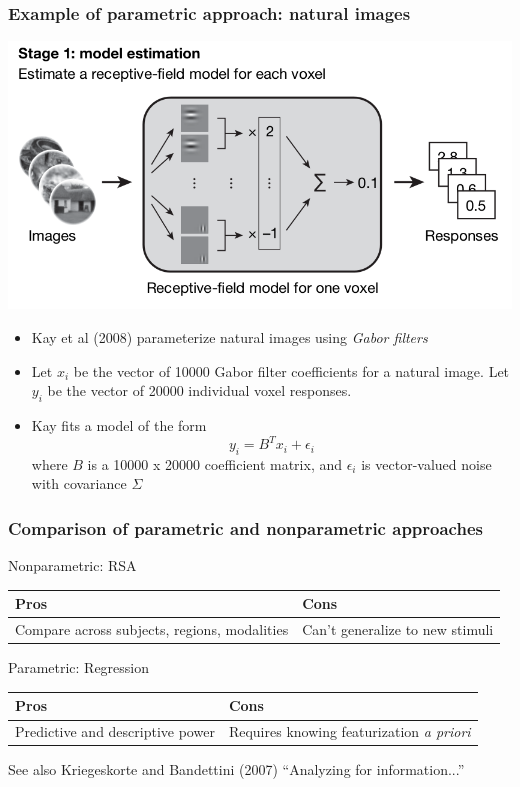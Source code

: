 \documentclass{beamer}
\begin{document}
\begin{frame}
\frametitle{Example of parametric approach: natural images}
\begin{center}
\includegraphics[scale = 0.2]{kay_stage1.png}
\end{center}
\begin{itemize}
\item Kay et al (2008) parameterize natural images using \emph{Gabor filters}
\item Let $x_i$ be the vector of 10000 Gabor filter coefficients for a natural image.
Let $y_i$ be the vector of 20000 individual voxel responses.
\item Kay fits a model of the form
\[
y_i = B^T x_i + \epsilon_i
\]
where $B$ is a 10000 x 20000 coefficient matrix, and $\epsilon_i$ is vector-valued noise with covariance $\Sigma$
\end{itemize}
\end{frame}

\begin{frame}
\frametitle{Comparison of parametric and nonparametric approaches}
Nonparametric: RSA
\begin{tabular}[t]{|p{5cm}|p{5cm}|}
\firsthline
Pros & Cons\\ \hline
Compare across subjects, regions, modalities & Can't generalize to new stimuli\\
\hline
\end{tabular}

\vspace{0.2in}
Parametric: Regression
\begin{tabular}[t]{|p{5cm}|p{5cm}|}
\firsthline
Pros & Cons\\ \hline
Predictive and descriptive power & Requires knowing featurization \emph{a priori}\\
\hline
\end{tabular}

\vspace{0.2in}
See also Kriegeskorte and Bandettini (2007) ``Analyzing for information...''
\end{frame}
\end{document}

